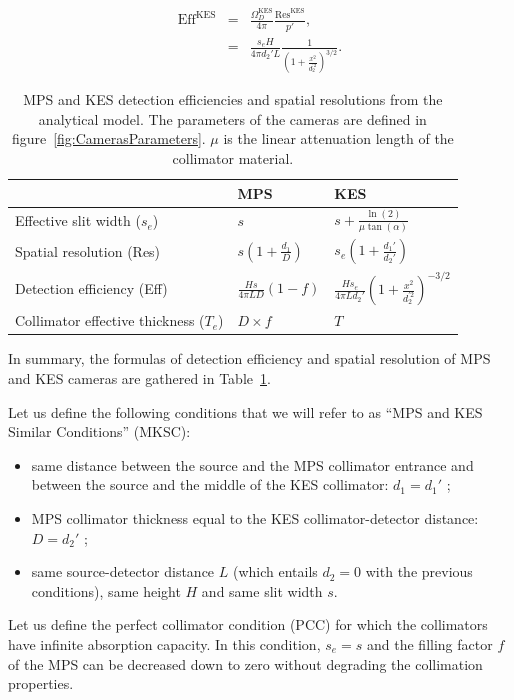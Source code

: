 \documentclass[a4paper,english,12pt]{article}
\newcommand{\qq}[1]{\enquote{#1}}
\newcommand\FOV{\textrm{Res}}
\newcommand\KES{\textrm{KES}}
\newcommand\du{}
\newcommand\DE{\textrm{Eff}}
\begin{document}
\begin{eqnarray}
  \label{eq:de_kes}
	\DE_{\du}^{\KES} & = & \frac{\Omega_D^{\KES}}{4\pi} \frac{\FOV_{\du}^{\KES}}{p'}, \nonumber\\
	& = & \frac{s_e H}{4\pi d_2' L} \frac{1}{\left( 1+\frac{x^2}{d_2^{'2}}\right)^{3/2}}.
\end{eqnarray}

\begin{table}[h]
\centering
\begin{tabular}{lll}
	\midrule
	                            & MPS                              & KES \\
	\midrule
	Effective slit width ($s_e$)& $s$                              & $s + \frac{\ln(2)}{\mu \tan(\alpha)}$ \\
 	Spatial resolution (Res)		& $s \left(1+\frac{d_1}{D}\right)$ & $s_e \left( 1+\frac{d_1'}{d_2'} \right)$ \\
	Detection efficiency (Eff)	& $\frac{H s}{ 4 \pi L D } (1-f) $ & $\frac{H s_e}{ 4 \pi L d_2' } \left( 1 + \frac{x^2}{d_2^{'2}} \right)^{-3/2} $ \\
 	Collimator effective thickness ($T_e$) & $D\times f$           & $T$ \\
	\midrule
\end{tabular}
\caption{MPS and KES detection efficiencies and spatial resolutions from the analytical model. The parameters of the cameras are defined in figure~\ref{fig:CamerasParameters}. $\mu$ is the linear attenuation length of the collimator material.}
\label{table:AMformulas}
\end{table}

In summary, the formulas of detection efficiency and spatial resolution of MPS and KES cameras are gathered in Table~\ref{table:AMformulas}.

Let us define the following conditions that we will refer to as \qq{MPS and KES Similar Conditions} (MKSC):
\begin{itemize}
	\item same distance between the source and the MPS collimator entrance and between the source and the middle of the KES collimator: $d_1=d_1'$ ;
	\item MPS collimator thickness equal to the KES collimator-detector distance: $D=d_2'$ ;
	\item same source-detector distance $L$ (which entails $d_2=0$ with the previous conditions), same height $H$ and same slit width $s$.
\end{itemize}
Let us define the perfect collimator condition (PCC) for which the collimators have infinite absorption capacity. In this condition, $s_e=s$ and the filling factor $f$ of the MPS can be decreased down to zero without degrading the collimation properties.
\end{document}
